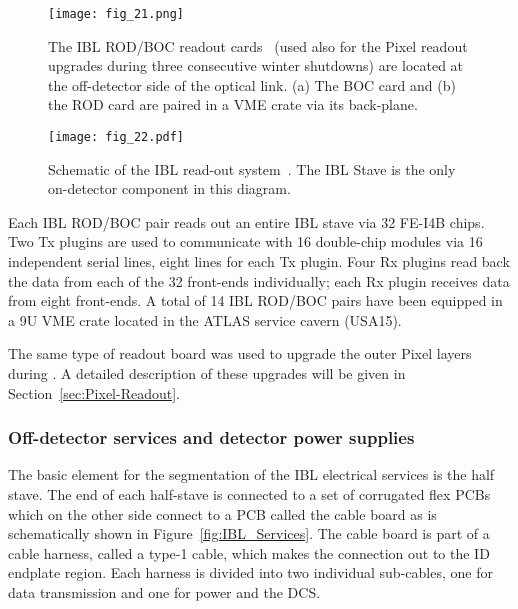 \documentclass[cernpreprint, atlasdraft=false, UKenglish,british,orcidlogo, texmf, orcidlogo]{atlasdoc}
\begin{document}
\begin{figure}
\centering
\texttt{[image: fig\_21.png]}
\caption{The \gls{IBL} \gls{ROD}/\gls{BOC} readout cards~\cite{PIX-2018-001} (used also for the Pixel readout upgrades during three consecutive winter shutdowns) are located at the off-detector side of the optical link. (a) The \gls{BOC} card and (b) the \gls{ROD} card are paired in a \gls{VME} crate via its back-plane. }
\label{fig:IBL_Readout}
\end{figure}
 
\begin{figure}
\centering
\texttt{[image: fig\_22.pdf]} 
\caption{Schematic of the \gls{IBL} read-out system~\cite{PIX-2018-001}. The \gls{IBL} Stave is the only on-detector component in this diagram.}
\label{fig:IBL_DAQ}
\end{figure}
 
Each \gls{IBL} \gls{ROD}/\gls{BOC} pair reads out an entire \gls{IBL} stave via 32 FE-I4B chips. Two \gls{Tx} plugins are used to communicate with \num{16} double-chip modules via 16 independent serial lines, eight lines for each \gls{Tx} plugin. Four \gls{Rx} plugins read back the data from each of the \num{32} front-ends individually; each \gls{Rx} plugin receives data from eight front-ends. A total of \num{14} \gls{IBL} \gls{ROD}/\gls{BOC} pairs have been equipped in a 9U \gls{VME} crate located in the ATLAS service cavern (\gls{USA15}).
 
The same type of readout board was used to upgrade the outer Pixel layers during \RunTwo.  A detailed description of these upgrades will be given in Section~\ref{sec:Pixel-Readout}.
 
 
\subsubsection{Off-detector services and detector power supplies}
 
The basic element for the segmentation of the \gls{IBL} electrical services is the half stave.
The end of each half-stave is connected to a set of corrugated flex \glspl{PCB} which on the other side connect to a \gls{PCB} called the cable board as is schematically shown in Figure~\ref{fig:IBL_Services}. The cable board is part of a cable harness, called a type-1 cable, which makes the connection out to the \gls{ID} endplate region. Each harness is divided into two individual sub-cables, one for data transmission and one for power and the \gls{DCS}.
 
\end{document}

